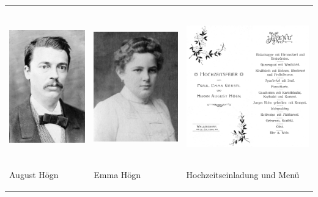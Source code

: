 \begin{flushleft}
\tablefirsthead{}
\tablehead{}
\tabletail{}
\tablelasttail{}
\begin{supertabular}{m{4.3650002cm}m{4.894cm}m{6.556cm}}

\includegraphics[width=4.182cm,height=6.186cm]{pictures/zulassungsarbeit-img012.jpg}

August Högn &

\includegraphics[width=4.711cm,height=6.189cm]{pictures/zulassungsarbeit-img013.jpg}

Emma Högn &

\includegraphics[width=6.218cm,height=6.179cm]{pictures/zulassungsarbeit-img014.png}

\label{bkm:Ref100297575}
Hochzeitseinladung und Menü\\
\end{supertabular}
\end{flushleft}
